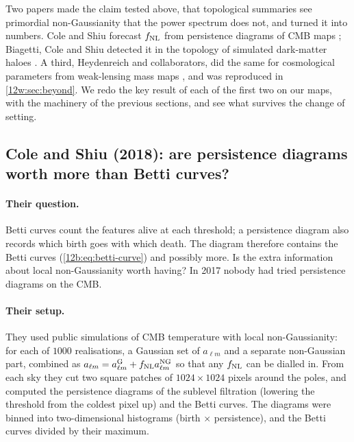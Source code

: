 Two papers made the claim tested above, that topological summaries see primordial non-Gaussianity that the power
spectrum does not, and turned it into numbers. Cole and Shiu forecast $f_{\rm NL}$ from persistence diagrams of CMB maps
\cite{ColeShiu2018}; Biagetti, Cole and Shiu detected it in the topology of simulated dark-matter haloes \cite{Biagetti2021}. A third,
Heydenreich and collaborators, did the same for cosmological parameters from weak-lensing mass maps \cite{Heydenreich2021}, and was
reproduced in \cref{12w:sec:beyond}. We redo the key result of each of the first two on our maps, with the machinery of the previous
sections, and see what survives the change of setting.

\subsection{Cole and Shiu (2018): are persistence diagrams worth more than Betti curves?}
\label{12c:sec:repro-cs}

\paragraph{Their question.} Betti curves count the features alive at each threshold; a persistence diagram also records which birth goes with
which death. The diagram therefore contains the Betti curves (\eqref{12b:eq:betti-curve}) and possibly more. Is the extra information about
local non-Gaussianity worth having? In 2017 nobody had tried persistence diagrams on the CMB.

\paragraph{Their setup.} They used public simulations of CMB temperature with local non-Gaussianity: for each of $1000$ realisations, a
Gaussian set of $a_{\ell m}$ and a separate non-Gaussian part, combined as $a_{\ell m}=a^{\rm G}_{\ell m}+f_{\rm NL}a^{\rm NG}_{\ell m}$ so that any
$f_{\rm NL}$ can be dialled in. From each sky they cut two square patches of $1024\times1024$ pixels around the poles, and computed the persistence
diagrams of the sublevel filtration (lowering the threshold from the coldest pixel up) and the Betti curves. The diagrams were binned into
two-dimensional histograms (birth $\times$ persistence), and the Betti curves divided by their maximum.

